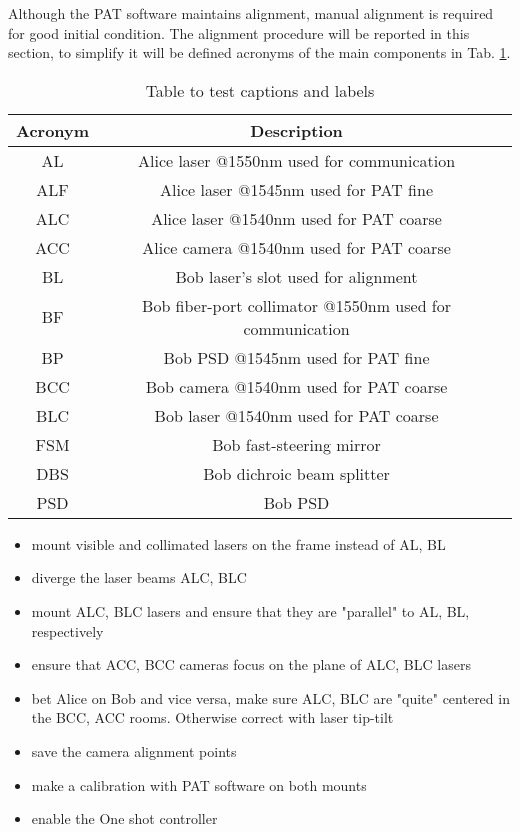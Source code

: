 Although the PAT software maintains alignment, manual alignment is required for good initial condition. The alignment procedure will be reported in this section, to simplify it will be defined acronyms of the main components in Tab. \ref{table:1}.

\begin{table}[h!]
  \centering
  \begin{tabular}{ |c|c|c| }
    \hline
    Acronym & Description                                              \\
    \hline
    AL      & Alice laser @1550nm used for communication               \\
    ALF     & Alice laser @1545nm used for PAT fine                    \\
    ALC     & Alice laser @1540nm used for PAT coarse                  \\
    ACC     & Alice camera @1540nm used for PAT coarse                 \\
    \hline
    BL      & Bob laser's slot used for alignment                      \\
    BF      & Bob fiber-port collimator @1550nm used for communication \\
    BP      & Bob PSD @1545nm used for PAT fine                        \\
    BCC     & Bob camera @1540nm used for PAT coarse                   \\
    BLC     & Bob laser @1540nm used for PAT coarse                    \\
    FSM     & Bob fast-steering mirror                                 \\
    DBS     & Bob dichroic beam splitter                               \\
    PSD     & Bob PSD                                                  \\
    \hline
  \end{tabular}
  \caption{Table to test captions and labels}
  \label{table:1}
\end{table}

\begin{itemize}
  \item mount visible and collimated lasers on the frame instead of AL, BL
  \item diverge the laser beams ALC, BLC
  \item mount ALC, BLC lasers and ensure that they are "parallel" to AL, BL, respectively
  \item ensure that ACC, BCC cameras focus on the plane of ALC, BLC lasers
  \item bet Alice on Bob and vice versa, make sure ALC, BLC are "quite" centered in the BCC, ACC rooms. Otherwise correct with laser tip-tilt
  \item save the camera alignment points
  \item make a calibration with PAT software on both mounts
  \item enable the One shot controller
\end{itemize}

